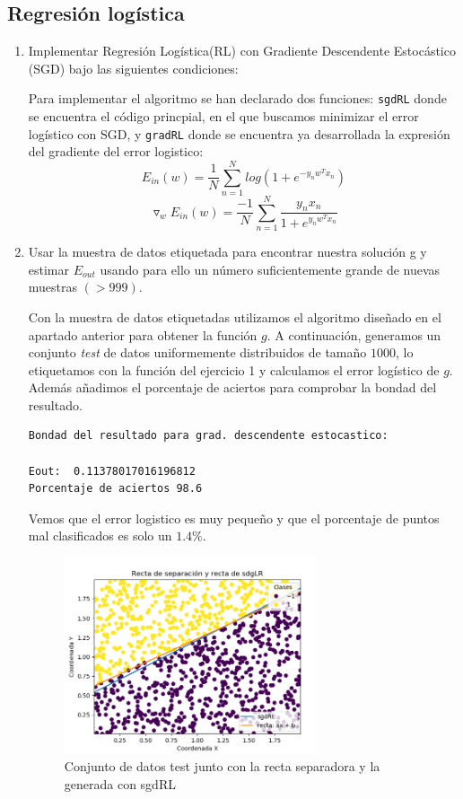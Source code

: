 \documentclass[size=a4, parskip=half, titlepage=false, toc=flat, toc=bib, 12pt]{scrartcl}
\begin{document}
\subsection{Regresión logística}
\begin{enumerate}
\item Implementar Regresión Logística(RL) con Gradiente Descendente Estocástico
(SGD) bajo las siguientes condiciones:

Para implementar el algoritmo se han declarado dos funciones: \verb|sgdRL| donde se encuentra el código princpial, en el que buscamos minimizar el error logístico con SGD, y \verb|gradRL| donde se encuentra ya desarrollada la expresión del gradiente del error logistico:
$$E_{in}(w) = \frac{1}{N} \sum_{n=1}^N log(1 + e^{-y_n w^T x_n}) $$
$$\triangledown_w E_{in}(w) = \frac{-1}{N} \sum_{n=1}^N \frac{y_nx_n}{1 + e^{y_n w^Tx_n}}$$


\item Usar la muestra de datos etiquetada para encontrar nuestra solución g y estimar
$E_{out}$ usando para ello un número suficientemente grande de nuevas muestras
$(>999)$.

Con la muestra de datos etiquetadas utilizamos el algoritmo diseñado en el apartado anterior para obtener la función $g$. A continuación, generamos un conjunto \textit{test} de datos uniformemente distribuidos de tamaño $1000$, lo etiquetamos con la función del ejercicio 1 y calculamos el error logístico de $g$. Además añadimos el porcentaje de aciertos para comprobar la bondad del resultado.
\begin{verbatim}
Bondad del resultado para grad. descendente estocastico:

Eout:  0.11378017016196812
Porcentaje de aciertos 98.6
\end{verbatim}

Vemos que el error logistico es muy pequeño y que el porcentaje de puntos mal clasificados es solo un $1.4\%$.

\begin{figure}[H]
\centering
{}
\includegraphics[width=0.7\textwidth]{./img/2b}
\caption{Conjunto de datos test junto con la recta separadora y la generada con sgdRL}
\end{figure}

\end{enumerate}
\end{document}
